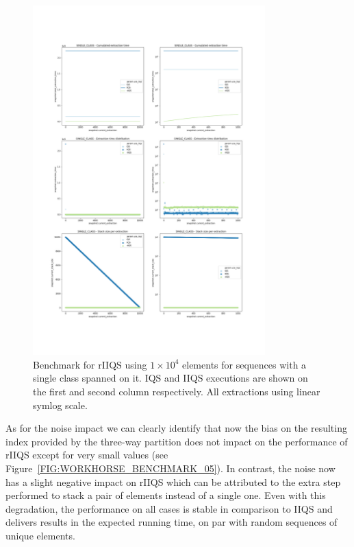 \begin{figure}[p]
    \centering
    \includegraphics[width=0.8\textwidth]{./fragments/05_workhorse_experiment/images/01_basebenchmark_04_single_class.png}
    \caption{Benchmark for rIIQS using $1\times10^4$ elements for sequences with a single class spanned on it. IQS and IIQS executions are shown on the first and second column respectively. All extractions using linear symlog scale.}
    \label{FIG:WORKHORSE_BENCHMARK_04}
\end{figure}


As for the noise impact we can clearly identify that now the bias on the resulting index provided by the three-way partition does not impact on the performance of rIIQS except for very small values (see Figure~\ref{FIG:WORKHORSE_BENCHMARK_05}). In contrast, the noise now has a slight negative impact on rIIQS which can be attributed to the extra step performed to stack a pair of elements instead of a single one. Even with this degradation, the performance on all cases is stable in comparison to IIQS and delivers results in the expected running time, on par with random sequences of unique elements.


